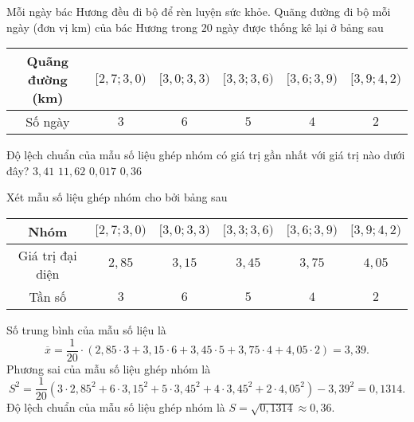 \begin{ex}%
	Mỗi ngày bác Hương đều đi bộ để rèn luyện sức khỏe. Quãng đường đi bộ mỗi ngày (đơn vị km) của bác Hương trong $20$ ngày được thống kê lại ở bảng sau
	\begin{center}
		\begin{tabular}{|c|c|c|c|c|c|}
			\hline
			Quãng đường (km) & $[2{,}7;3{,}0)$ & $[3{,}0;3{,}3)$ & $[3{,}3;3{,}6)$ & $[3{,}6;3{,}9)$ & $[3{,}9;4{,}2)$ \\
			\hline
			Số ngày          & $3$             & $6$             & $5$             & $4$             & $2$             \\
			\hline
		\end{tabular}
	\end{center}
	Độ lệch chuẩn của mẫu số liệu ghép nhóm có giá trị gần nhất với giá trị nào dưới đây?
	\choice
	{$3{,}41$}
	{$11{,}62$}
	{$0{,}017$}
	{\True $0{,}36$}
	\loigiai
	{
	Xét mẫu số liệu ghép nhóm cho bởi bảng sau
	\begin{center}
		\begin{tabular}{|c|c|c|c|c|c|}
			\hline
			Nhóm             & $[2{,}7;3{,}0)$ & $[3{,}0;3{,}3)$ & $[3{,}3;3{,}6)$ & $[3{,}6;3{,}9)$ & $[3{,}9;4{,}2)$ \\
			\hline
			Giá trị đại diện & $2{,}85$        & $3{,}15$        & $3{,}45$        & $3{,}75$        & $4{,}05$        \\
			\hline
			Tần số           & $3$             & $6$             & $5$             & $4$             & $2$             \\
			\hline
		\end{tabular}
	\end{center}
	Số trung bình của mẫu số liệu là
	$$\overline{x}=\dfrac{1}{20}\cdot (2{,}85\cdot 3+3{,}15\cdot 6+3{,}45\cdot 5+3{,}75\cdot 4+4{,}05\cdot 2)=3{,}39.$$
	Phương sai của mẫu số liệu ghép nhóm là
	$$S^2=\dfrac{1}{20}\left(3\cdot 2{,}85^2+6\cdot 3{,}15^2+5\cdot 3{,}45^2+4\cdot 3{,}45^2+2\cdot 4{,}05^2\right)-3{,}39^2=0{,}1314.$$
	Độ lệch chuẩn của mẫu số liệu ghép nhóm là $S=\sqrt{0{,}1314}\approx 0{,}36$.
	}
\end{ex}


